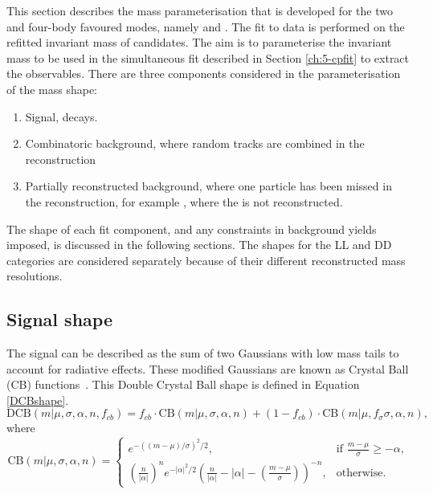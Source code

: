 This section describes the mass parameterisation that is developed for the two and four-body favoured \D modes, namely \decay{\Bm}{\D(\Km\pip)\Kstarm} and \decay{\Bm}{\D(\Km\pip\pim\pip)\Kstarm}. The fit to data is performed on the refitted invariant mass of \B candidates. The aim is to parameterise the invariant \B mass to be used in the simultaneous fit described in Section \ref{ch:5-cpfit} to extract the \CP observables. There are three components considered in the parameterisation of the mass shape:
\begin{enumerate}
\item Signal, \decay{\Bm}{\D\Kstarm} decays.
\item Combinatoric background, where random tracks are combined in the reconstruction 
\item Partially reconstructed background, where one particle has been missed in the reconstruction, for example \decay{\Bm}{(\decay{\Dstarz}{\Dz[\piz]})\Kstarm}, where the \piz is not reconstructed.
\end{enumerate}

The shape of each fit component, and any constraints in background yields imposed, is discussed in the following sections. The shapes for the LL and DD \KS categories are considered separately because of their different reconstructed \B mass resolutions.

\subsection{Signal shape}
\label{sec:massfit:signal}

The signal can be described as the sum of two Gaussians with low mass tails to account for radiative effects. These modified Gaussians are known as Crystal Ball (CB) functions~\cite{Skwarnicki:1986xj}. This Double Crystal Ball shape is defined in Equation \ref{DCBshape}. 
\begin{equation}
\mathrm{DCB}(m| \mu,\sigma,\alpha,n,f_{cb}) = f_{cb} \cdot \mathrm{CB}(m| \mu,\sigma,\alpha,n) + (1-f_{cb}) \cdot \mathrm{CB}(m|\mu,f_{\sigma}\sigma,\alpha,n),
\label{DCBshape}
\end{equation}
where
\begin{equation*}
  \mathrm{CB}(m| \mu,\sigma,\alpha,n)=
\begin{cases}
    e^{-((m-\mu)/ \sigma)^2/2},                                   & \text{if } \frac{m-\mu}{\sigma} \geq - \alpha, \\
   \left ( \frac{n}{|\alpha|} \right ) ^n e^{-|\alpha|^2/2} \left ( \frac{n}{|\alpha|} - |\alpha| - \left ( \frac{m-\mu}{\sigma} \right ) \right ) ^{-n} ,    & \text{otherwise.}
\end{cases}
\end{equation*}

